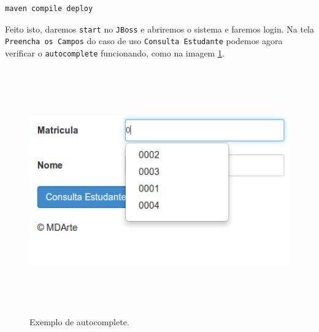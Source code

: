 \begin{lstlisting}[language=bash, frame=single, breaklines=true]
maven compile deploy
\end{lstlisting}

Feito isto, daremos \texttt{start} no \texttt{JBoss} e abriremos o sistema e
faremos login. Na tela \texttt{Preencha os Campos} do caso de uso
\texttt{Consulta Estudante} podemos agora verificar o \texttt{autocomplete}
funcionando, como na imagem \ref{exemplo_autocomplete}.

\begin{figure}[H]
	\centering
	\includegraphics[width=350pt,height=300pt]{files/imgs/tutorial-mdarte-0029.png}
	\caption{Exemplo de autocomplete.}
	\label{exemplo_autocomplete}
\end{figure}